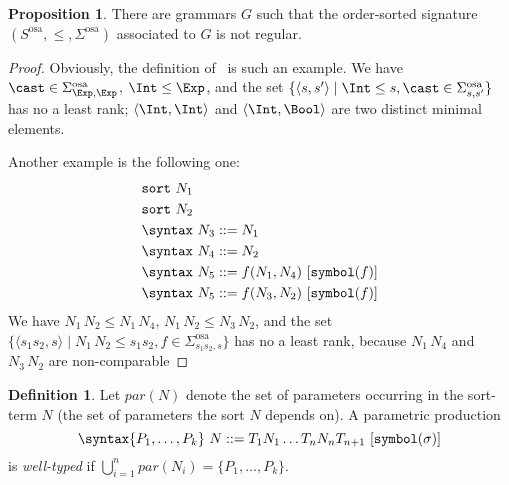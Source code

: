 \documentclass{article}
\theoremstyle{definition}
\theoremstyle{definition}
\theoremstyle{definition}
\newtheorem{definition}{Definition}[section]
\theoremstyle{definition}
\theoremstyle{theorem}
\theoremstyle{theorem}
\theoremstyle{theorem}
\theoremstyle{theorem}
\newtheorem{proposition}{Proposition}[section]
\theoremstyle{theorem}
\newcommand{\KWsymbol}{\texttt{symbol}}
\newcommand{\sort}{\texttt{sort}}
\begin{document}
{\begin{proposition}\label{prop:non-regular}
There are grammars $G$ such that the order-sorted signature $(S^\textrm{osa},\le, \Sigma^\textrm{osa})$ associated to $G$ is not regular.
\end{proposition}
\begin{proof}
Obviously, the definition of \cast\ is such an example. We have $\cast\in\Sigma^\textrm{osa}_{\Exp,\Exp}$, $\Int\le\Exp$,  and the set $\{\langle s,s'\rangle\mid\Int\le s, \cast\in\Sigma^\textrm{osa}_{s,s'}\}$ has no a least rank; $\langle \Int,\Int\rangle$ and $\langle \Int,\Bool\rangle$ are two distinct minimal elements. 

Another example is the following one:
\begin{align*}
&\sort\ N_1\\
&\sort\ N_2\\
&\syntax\ N_3 ::= N_1\\
&\syntax\ N_4 ::= N_2\\
&\syntax\ N_5 ::= f(N_1,N_4)\ [\KWsymbol(f)]\\ 
&\syntax\ N_5 ::= f(N_3,N_2)\ [\KWsymbol(f)]
\end{align*}
We have $N_1\,N_2\le N_1\,N_4$, $N_1\,N_2\le N_3\,N_2$, and the set $\{\langle s_1s_2,s\rangle\mid N_1\,N_2\le s_1s_2, f\in\Sigma^\textrm{osa}_{s_1s_2,s}\}$ has no a least rank, because $N_1\,N_4$ and $N_3\,N_2$ are non-comparable
\end{proof}

\begin{definition}
Let $\mathit{par}(N)$ denote the set of parameters occurring in the sort-term $N$ (the set of parameters the sort $N$ depends on). 
A parametric production
\[\syntax\{P_1,\ldots,P_k\}\ N ::= T_1 N_1 \ldots T_n N_n T_{n+1}\ [\KWsymbol(\sigma)]\]
is \emph{well-typed} if $\bigcup_{i=1}^n\mathit{par}(N_i)=\{P_1,\ldots,P_k\}$.
\end{definition}

}
\end{document}
